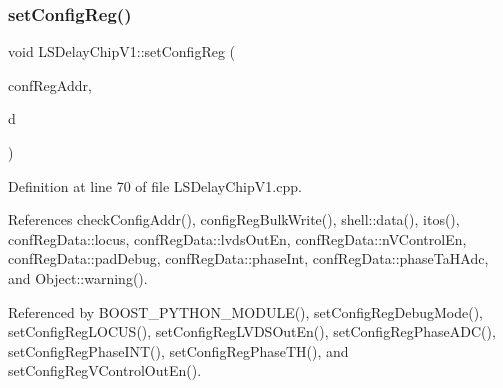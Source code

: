 \subsubsection{\texorpdfstring{set\+Config\+Reg()}{setConfigReg()}}
{\footnotesize\ttfamily void L\+S\+Delay\+Chip\+V1\+::set\+Config\+Reg (\begin{DoxyParamCaption}\item[{\hyperlink{ICECALv3_8h_a3cb25ca6f51f003950f9625ff05536fc}{U8}}]{conf\+Reg\+Addr,  }\item[{\hyperlink{structconfRegData}{conf\+Reg\+Data}}]{d }\end{DoxyParamCaption})}



Definition at line 70 of file L\+S\+Delay\+Chip\+V1.\+cpp.



References check\+Config\+Addr(), config\+Reg\+Bulk\+Write(), shell\+::data(), itos(), conf\+Reg\+Data\+::locus, conf\+Reg\+Data\+::lvds\+Out\+En, conf\+Reg\+Data\+::n\+V\+Control\+En, conf\+Reg\+Data\+::pad\+Debug, conf\+Reg\+Data\+::phase\+Int, conf\+Reg\+Data\+::phase\+Ta\+H\+Adc, and Object\+::warning().



Referenced by B\+O\+O\+S\+T\+\_\+\+P\+Y\+T\+H\+O\+N\+\_\+\+M\+O\+D\+U\+L\+E(), set\+Config\+Reg\+Debug\+Mode(), set\+Config\+Reg\+L\+O\+C\+U\+S(), set\+Config\+Reg\+L\+V\+D\+S\+Out\+En(), set\+Config\+Reg\+Phase\+A\+D\+C(), set\+Config\+Reg\+Phase\+I\+N\+T(), set\+Config\+Reg\+Phase\+T\+H(), and set\+Config\+Reg\+V\+Control\+Out\+En().


